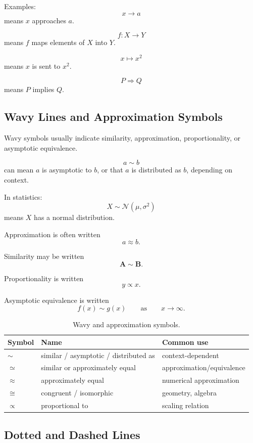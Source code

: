 \documentclass[11pt,twocolumn]{article}
\newcommand{\mat}[1]{\symbf{#1}}     %
\newcommand{\Normal}{\mathcal{N}}
\begin{document}
Examples:
\[
x\to a
\]
means \(x\) approaches \(a\).

\[
f:X\to Y
\]
means \(f\) maps elements of \(X\) into \(Y\).

\[
x\mapsto x^2
\]
means \(x\) is sent to \(x^2\).

\[
P\Rightarrow Q
\]
means \(P\) implies \(Q\).

\subsection{Wavy Lines and Approximation Symbols}

Wavy symbols usually indicate similarity, approximation, proportionality, or
asymptotic equivalence.

\[
a \sim b
\]
can mean \(a\) is asymptotic to \(b\), or that \(a\) is distributed as \(b\),
depending on context.

In statistics:
\[
X \sim \Normal(\mu,\sigma^2)
\]
means \(X\) has a normal distribution.

Approximation is often written
\[
a \approx b.
\]

Similarity may be written
\[
\mat{A} \sim \mat{B}.
\]

Proportionality is written
\[
y \propto x.
\]

Asymptotic equivalence is written
\[
f(x) \sim g(x)
\qquad
\text{as}
\qquad
x\to\infty.
\]

\begin{table}[ht]
\centering
\small
\caption{Wavy and approximation symbols.}
\begin{tabular}{lll}
\toprule
Symbol & Name & Common use \\
\midrule
$\sim$ & similar / asymptotic / distributed as & context-dependent \\
$\simeq$ & similar or approximately equal & approximation/equivalence \\
$\approx$ & approximately equal & numerical approximation \\
$\cong$ & congruent / isomorphic & geometry, algebra \\
$\propto$ & proportional to & scaling relation \\
\bottomrule
\end{tabular}
\end{table}

\subsection{Dotted and Dashed Lines}
\end{document}
